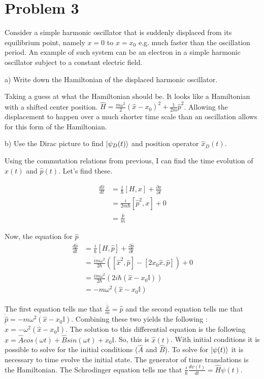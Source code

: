 \documentclass[aps,prl,preprint,groupedaddress]{revtex4-1}
\begin{document}
\section{Problem 3}
Consider a simple harmonic oscillator that is suddenly displaced from its equilibrium point, namely $x = 0$ to $x = x_0$ e.g. much faster than the oscillation period. An example of such system can be an electron in a simple harmonic oscillator subject to a constant electric ﬁeld.

a) Write down the Hamiltonian of the displaced harmonic oscillator.

Taking a guess at what the Hamiltonian should be. It looks like a Hamiltonian with a shifted center position. $\hat{H} = \frac{m\omega^2}{2}(\hat{x}-x_0)^2 + \frac{1}{2m}\hat{p}^2$. Allowing the displacement to happen over a much shorter time scale than an oscillation allows for this form of the Hamiltonian.

b) Use the Dirac picture to find $\ket{\psi_D(t)}$ and position operator $\hat{x}_D(t)$. 

Using the commutation relations from previous, I can find the time evolution of $\hat{x}(t)$ and $\hat{p}(t)$. Let's find these.

\begin{align*}
\frac{d\hat{x}}{dt} &= \frac{i}{\hbar}[H,x] + \frac{\partial x}{\partial t}\\
&= \frac{i}{2m\hbar}[\hat{p}^2,x] + 0 \\
&= \frac{\hat{p}}{m}
\end{align*}

Now, the equation for $\hat{p}$
\begin{align*}
\frac{d\hat{p}}{dt}&=\frac{i}{\hbar}[H,\hat{p}]+\frac{\partial \hat{p}}{\partial t}\\
&=\frac{i m\omega^2}{2 \hbar}([\hat{x}^2,\hat{p}]-[2x_0\hat{x},\hat{p}])+0\\
&=\frac{i m\omega^2}{2 \hbar}(2i\hbar(\hat{x}-x_0\mathbb{I}))\\
&=-m\omega^2(\hat{x}-x_0\mathbb{I})
\end{align*}

The first equation tells me that $\frac{\dot{\hat{x}}}{m} = \hat{p}$ and the second equation tells me that $\dot{\hat{p}} = -m\omega^2(\hat{x}-x_0\mathbb{I})$. Combining these two yields the following : $\ddot{\hat{x}}=-\omega^2(\hat{x}-x_0\mathbb{I})$. The solution to this differential equation is the following $\hat{x}=\hat{A}cos(\omega t)+\hat{B}sin(\omega t) + x_0\mathbb{I}$. So, this is $\hat{x}(t)$. With initial conditions it is possible to solve for the initial conditions ($\hat{A}$ and $\hat{B}$).
To solve for $\ket{\psi(t)}$ it is necessary to time evolve the initial state. The generator of time translations is the Hamiltonian. The Schrodinger equation tells me that $\frac{i}{\hbar}\frac{d\psi(t)}{dt}=\hat{H}\psi(t)$.
\end{document}
